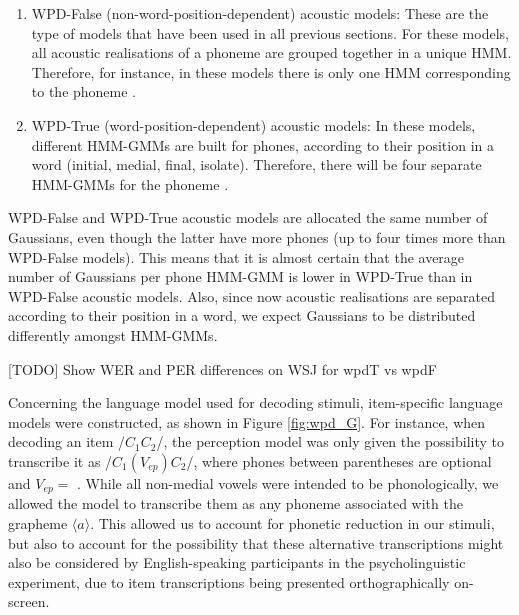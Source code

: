 {\begin{enumerate}
\item WPD-False (non-word-position-dependent) acoustic models: These are the type of models that have been used in all previous sections. For these models, all acoustic realisations of a phoneme are grouped together in a unique HMM. Therefore, for instance, in these models there is only one HMM corresponding to the phoneme .
  \item WPD-True (word-position-dependent) acoustic models: In these models, different HMM-GMMs are built for phones, according to their position in a word (initial, medial, final, isolate). Therefore, there will be four separate HMM-GMMs for the phoneme .  
\end{enumerate}

WPD-False and WPD-True acoustic models are allocated the same number of Gaussians, even though the latter have more phones (up to four times more than WPD-False models). This means that it is almost certain that the average number of Gaussians per phone HMM-GMM is lower in WPD-True than in WPD-False acoustic models. Also, since now acoustic realisations are separated according to their position in a word, we expect Gaussians to be distributed differently amongst HMM-GMMs.

{\color{red}[TODO] Show WER and PER differences on WSJ for wpdT vs wpdF}

Concerning the language model used for decoding stimuli, item-specific language models were constructed, as shown in Figure \ref{fig:wpd_G}. For instance, when decoding an item /$C_{1}C_{2}$/, the perception model was only given the possibility to transcribe it as /$C_{1}(V_{ep})C_{2}$/, where phones between parentheses are optional and $V_{ep} = $ \textipa{[@]}. %
While all non-medial vowels were intended to be  phonologically, we allowed the model to transcribe them as any phoneme associated with the grapheme $\langle a \rangle$. This allowed us to account for phonetic reduction in our stimuli, but also to account for the possibility that these alternative transcriptions might also be considered by English-speaking participants in the psycholinguistic experiment, due to item transcriptions being presented orthographically on-screen.

}

